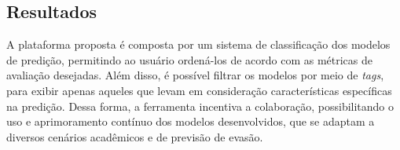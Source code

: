 \documentclass[12pt]{article}
\begin{document}



\subsection{Resultados}

A plataforma proposta é composta por um sistema de classificação dos modelos de predição, permitindo ao usuário ordená-los de acordo com as métricas de avaliação desejadas. Além disso, é possível filtrar os modelos por meio de \textit{tags}, para exibir apenas aqueles que levam em consideração características específicas na predição. Dessa forma, a ferramenta incentiva a colaboração, possibilitando o uso e aprimoramento contínuo dos modelos desenvolvidos, que se adaptam a diversos cenários acadêmicos e de previsão de evasão.
\end{document}
